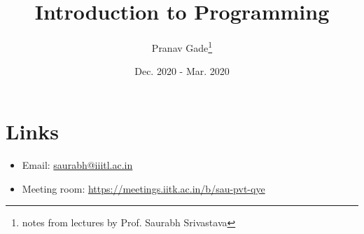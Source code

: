 \documentclass[10pt, a4paper]{report}
\author{Pranav Gade\thanks{notes from lectures by Prof. Saurabh Srivastava}}
\date{Dec. 2020 - Mar. 2020}
\title{Introduction to Programming}
\begin{document}
	\maketitle
	\section*{Links}
	\begin{itemize}
		\item Email: \href{mailto:saurabh@iiitl.ac.in}{saurabh@iiitl.ac.in}
		\item Meeting room: \href{https://meetings.iitk.ac.in/b/sau-pvt-qye}{https://meetings.iitk.ac.in/b/sau-pvt-qye}
	\end{itemize}
	\newpage
	
	
\end{document}
